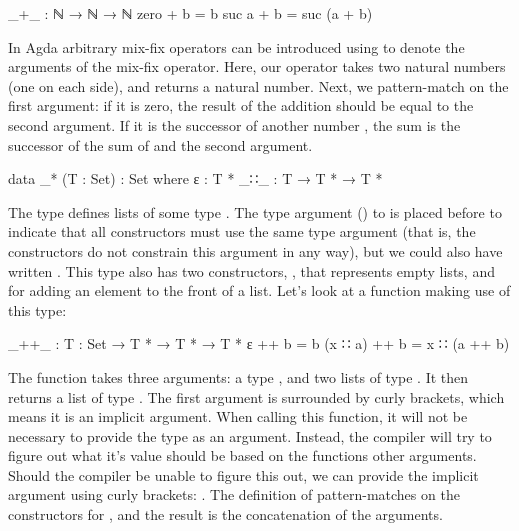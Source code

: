 		\begin{code}
			_+_ : ℕ → ℕ → ℕ
			zero   + b = b
			suc a  + b = suc (a + b)
		\end{code}

		In Agda arbitrary mix-fix operators can be introduced using \codett{\_}
		to denote the arguments of the mix-fix operator. Here, our operator
		\codett{\_+\_} takes two natural numbers (one on each side), and
		returns a natural number. Next, we pattern-match on the first argument:
		if it is zero, the result of the addition should be equal to the second
		argument. If it is the successor of another number , the sum
		is the successor of the sum of  and the second argument.

		\begin{code}
			data _* (T : Set) : Set where
			  ε    : T *
			  _∷_  : T → T * → T *
		\end{code}

		The type \codett{\_*} defines lists of some type . The type
		argument () to \codett{\_*} is placed before \codett{:}
		to indicate that all constructors must use the same type argument (that
		is, the constructors do not constrain this argument in any way), but we
		could also have written . This type
		also has two constructors, , that represents empty lists, and
		 for adding an element to the front of a list. Let's look
		at a function making use of this type:

		\begin{code}
			_++_ : {T : Set} → T * → T * → T *
			ε        ++ b = b
			(x ∷ a)  ++ b = x ∷ (a ++ b)
		\end{code}

		The function \codett{\_++\_} takes three arguments: a type ,
		and two lists of type . It then returns a list of type
		. The first argument is surrounded by curly brackets, which
		means it is an implicit argument. When calling this function, it will
		not be necessary to provide the type as an argument. Instead, the
		compiler will try to figure out what it's value should be based on the
		functions other arguments. Should the compiler be unable to figure this
		out, we can provide the implicit argument using curly brackets:
		. The definition of \codett{\_++\_}
		pattern-matches on the constructors for , and the result is
		the concatenation of the arguments.

